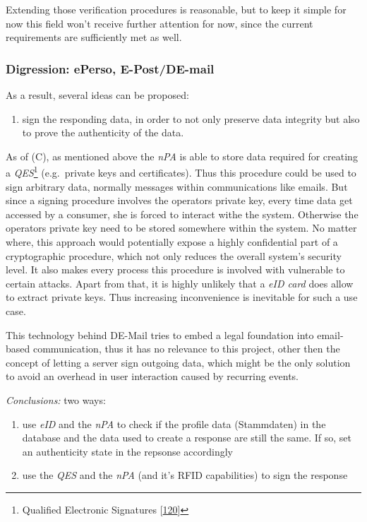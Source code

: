 \documentclass[12pt,english,a4paper,titlepage,cleardoublepage=empty,dottedtoc]{report}
\providecommand{\tightlist}{%
  \setlength{\itemsep}{0pt}\setlength{\parskip}{0pt}}
\begin{document}
Extending those verification procedures is reasonable, but to keep it
simple for now this field won't receive further attention for now, since
the current requirements are sufficiently met as well.

\subsubsection{Digression: ePerso,
E-Post/DE-mail}\label{digression-eperso-e-postde-mail}

As a result, several ideas can be proposed:

\begin{enumerate}
\def\labelenumi{(\Alph{enumi})}
\setcounter{enumi}{2}
\tightlist
\item
  sign the responding data, in order to not only preserve data integrity
  but also to prove the authenticity of the data.
\end{enumerate}

As of (C), as mentioned above the \emph{nPA} is able to store data
required for creating a \emph{QES}\footnote{Qualified Electronic
  Signatures
  {[}\protect\hyperlink{ref-paper_2013-keymanangement-fuer-qes-mit-npa}{120}{]}}
(e.g.~private keys and certificates). Thus this procedure could be used
to sign arbitrary data, normally messages within communications like
emails. But since a signing procedure involves the operators private
key, every time data get accessed by a consumer, she is forced to
interact withe the system. Otherwise the operators private key need to
be stored somewhere within the system. No matter where, this approach
would potentially expose a highly confidential part of a cryptographic
procedure, which not only reduces the overall system's security level.
It also makes every process this procedure is involved with vulnerable
to certain attacks. Apart from that, it is highly unlikely that a
\emph{eID card} does allow to extract private keys. Thus increasing
inconvenience is inevitable for such a use case.

This technology behind DE-Mail tries to embed a legal foundation into
email-based communication, thus it has no relevance to this project,
other then the concept of letting a server sign outgoing data, which
might be the only solution to avoid an overhead in user interaction
caused by recurring events.

\emph{Conclusions:} two ways:

\begin{enumerate}
\def\labelenumi{(\arabic{enumi})}
\tightlist
\item
  use \emph{eID} and the \emph{nPA} to check if the profile data
  (Stammdaten) in the database and the data used to create a response
  are still the same. If so, set an authenticity state in the repsonse
  accordingly
\item
  use the \emph{QES} and the \emph{nPA} (and it's RFID capabilities) to
  sign the response
\end{enumerate}
\end{document}
